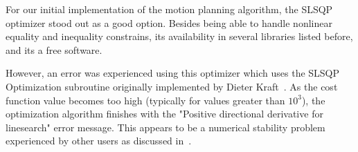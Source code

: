




For our initial implementation of the motion planning algorithm, the
SLSQP optimizer stood out
as a good option.
Besides being able to handle nonlinear equality and inequality 
constrains, its availability in several libraries listed before, and its a free software.


However, an error was experienced using this optimizer which uses the SLSQP 
Optimization subroutine originally implemented by Dieter Kraft~\cite{Kraft1988}.
As the cost function value becomes too high (typically for values greater than 
$10^3$), the optimization algorithm finishes with the "Positive 
directional derivative for linesearch" error message. This appears to be
a numerical stability problem experienced by other users as discussed in~\cite{slsqperror}.

